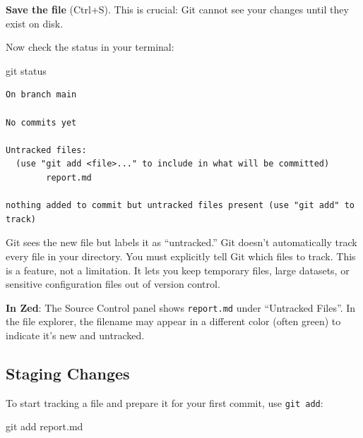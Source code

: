 \documentclass[
  letterpaper,
  DIV=11,
  numbers=noendperiod]{scrreprt}
\newenvironment{Shaded}{\begin{snugshade}}{\end{snugshade}}
\newcommand{\FunctionTok}[1]{\textcolor[rgb]{0.28,0.35,0.67}{#1}}
\newcommand{\NormalTok}[1]{\textcolor[rgb]{0.00,0.23,0.31}{#1}}
\begin{document}
\textbf{Save the file} (Ctrl+S). This is crucial: Git cannot see your
changes until they exist on disk.

Now check the status in your terminal:

\begin{codelisting}

\caption{\texttt{terminal}}

\begin{Shaded}
\begin{Highlighting}[]
\FunctionTok{git}\NormalTok{ status}
\end{Highlighting}
\end{Shaded}

\end{codelisting}

\begin{verbatim}
On branch main

No commits yet

Untracked files:
  (use "git add <file>..." to include in what will be committed)
        report.md

nothing added to commit but untracked files present (use "git add" to track)
\end{verbatim}

Git sees the new file but labels it as ``untracked.'' Git doesn't
automatically track every file in your directory. You must explicitly
tell Git which files to track. This is a feature, not a limitation. It
lets you keep temporary files, large datasets, or sensitive
configuration files out of version control.

\textbf{In Zed}: The Source Control panel shows \texttt{report.md} under
``Untracked Files''. In the file explorer, the filename may appear in a
different color (often green) to indicate it's new and untracked.

\subsection{Staging Changes}\label{staging-changes}

To start tracking a file and prepare it for your first commit, use
\texttt{git\ add}:

\begin{codelisting}

\caption{\texttt{terminal}}

\begin{Shaded}
\begin{Highlighting}[]
\FunctionTok{git}\NormalTok{ add report.md}
\end{Highlighting}
\end{Shaded}

\end{codelisting}
\end{document}
